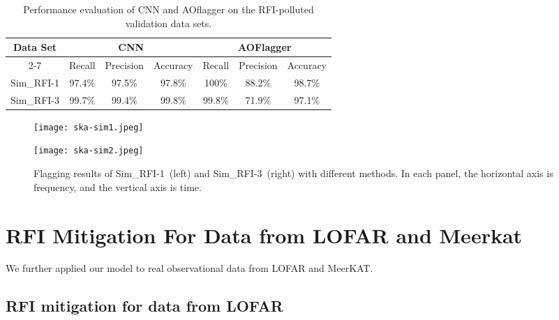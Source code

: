\documentclass[usenatbib]{mnras}
\begin{document}
\begin{table*}
\caption{Performance evaluation of CNN and AOflagger on the RFI-polluted validation data sets.}
\begin{tabular}{ccccccc}
\toprule

\multirow{3}{*}{Data Set} & \multicolumn{3}{c}{CNN} &  \multicolumn{3}{c}{AOFlagger}\\

\cline{2-7}
& Recall  & Precision  & Accuracy & Recall  & Precision  & Accuracy \\

\midrule
Sim\_RFI-1 &97.4\%&97.5\%&97.8\%  &100\%&88.2\%&98.7\%\\


Sim\_RFI-3    & 99.7\% & 99.4\%  & 99.8\%  & 99.8\% & 71.9\%  & 97.1\% \\ 

\bottomrule
\end{tabular}
\label{tab:result}
\end{table*}



\begin{figure*}
\centering
\begin{minipage}[t]{0.48\textwidth}
\centering
\texttt{[image: ska-sim1.jpeg]}
\end{minipage}
\begin{minipage}[t]{0.50\textwidth}
\centering
\texttt{[image: ska-sim2.jpeg]}
\end{minipage}
\caption{Flagging results of Sim\_RFI-1~(left) and Sim\_RFI-3~(right) with different methods. In each panel, the horizontal axis is frequency, and the vertical axis is time. }
\label{fig:sim1_sim2}
\end{figure*}


\section{RFI Mitigation For Data from LOFAR and Meerkat}
\label{4}
We further applied our model to real observational data from LOFAR and MeerKAT. 

\subsection{RFI mitigation for data from LOFAR}
\label{lofar_rfi}
\end{document}

